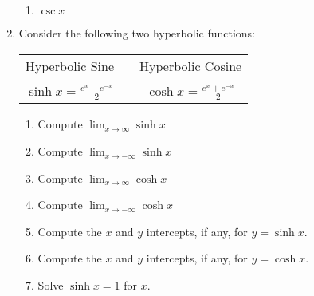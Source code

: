 \documentclass[12pt]{article}
\newif\ifans
\begin{document}
\begin{enumerate}
\begin{enumerate}
\item $\csc{x}$

\end{enumerate}

\ifans{\fbox{C}} \fi

\item Consider the following two hyperbolic functions:

\smallskip

\begin{center}
\begin{tabular}{ccc}
Hyperbolic Sine & & Hyperbolic Cosine\\
& & \\
$\sinh{x}=\frac{e^x-e^{-x}}{2}$ & \hspace{1 cm} & $\cosh{x}=\frac{e^x+e^{-x}}{2}$
\end{tabular}
\end{center}

\smallskip

\begin{enumerate}

\item Compute $\lim_{x \rightarrow \infty}{\sinh{x}}$

\ifans{\fbox{$+\infty$}} \fi

\item Compute $\lim_{x \rightarrow -\infty}{\sinh{x}}$

\ifans{\fbox{$-\infty$}} \fi

\item Compute $\lim_{x \rightarrow \infty}{\cosh{x}}$

\ifans{\fbox{$+\infty$}} \fi

\item Compute $\lim_{x \rightarrow -\infty}{\cosh{x}}$

\ifans{\fbox{$+\infty$}} \fi

\item Compute the $x$ and $y$ intercepts, if any, for $y=\sinh{x}$.

\ifans{\fbox{The $x$ and $y$ intercept of $y=\sinh{x}$ is $(0,0)$.}} \fi

\item Compute the $x$ and $y$ intercepts, if any, for $y=\cosh{x}$.

\ifans{\fbox{$y=\cosh{x}$ has a $y$-intercept of  $(0,1)$; but, it does not have any $x$ intercepts.}} \fi

\item Solve $\sinh{x}=1$ for $x$.


\end{enumerate}
\end{enumerate}
\end{document}

